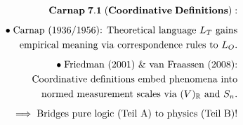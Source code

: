 \documentclass[preview]{standalone}
\begin{document}
\begin{align*}
\special{dvisvgm:raw <g id='unique000'>}\mathbf{Carnap\;7.1\;(Coordinative\;Definitions):}\\[5pt]\bullet\;\text{Carnap (1936/1956): Theoretical language }L_T\text{ gains}\\\;\;\text{empirical meaning via correspondence rules to }L_O.\\[5pt]\bullet\;\text{Friedman (2001) \& van Fraassen (2008):}\\\;\;\text{Coordinative definitions embed phenomena into}\\\;\;\text{normed measurement scales via }(V)_{\mathbb{R}}\text{ and }S_n.\\[5pt]\implies\text{Bridges pure logic (Teil A) to physics (Teil B)!}\special{dvisvgm:raw </g>}
\end{align*}
\end{document}
